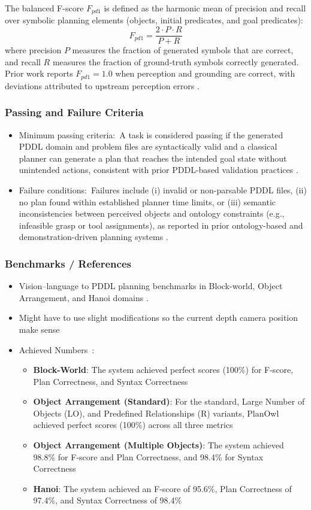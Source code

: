 \documentclass[12pt]{article}
\begin{document}
The balanced F-score $F_{pd1}$ is defined as the harmonic mean of precision and recall over symbolic planning elements (objects, initial predicates, and goal predicates):
\[
F_{pd1} = \frac{2 \cdot P \cdot R}{P + R}
\]
where precision $P$ measures the fraction of generated symbols that are correct, and recall $R$ measures the fraction of ground-truth symbols correctly generated. Prior work reports $F_{pd1} = 1.0$ when perception and grounding are correct, with deviations attributed to upstream perception errors \cite{planowl}.

\subsubsection{Passing and Failure Criteria}
\begin{itemize}
\item Minimum passing criteria:\ 
A task is considered passing if the generated PDDL domain and problem files are syntactically valid and a classical planner can generate a plan that reaches the intended goal state without unintended actions, consistent with prior PDDL-based validation practices \cite{planowl,mbse}.
\item Failure conditions:\ 
Failures include (i) invalid or non-parsable PDDL files, (ii) no plan found within established planner time limits, or (iii) semantic inconsistencies between perceived objects and ontology constraints (e.g., infeasible grasp or tool assignments), as reported in prior ontology-based and demonstration-driven planning systems \cite{diehl, ontology}.
\end{itemize}

\subsubsection{Benchmarks / References}
\begin{itemize}
\item Vision--language to PDDL planning benchmarks in Block-world, Object Arrangement, and Hanoi domains \cite{planowl}.
\item Might have to use slight modifications so the current depth camera position make sense
\item Achieved Numbers~\cite{planowl}:
\begin{itemize}
    \item \textbf{Block-World}: The system achieved perfect scores (100\%) for F-score, Plan Correctness, and Syntax Correctness
    \item \textbf{Object Arrangement (Standard)}: For the standard, Large Number of Objects (LO), and Predefined Relationships (R) variants, PlanOwl achieved perfect scores (100\%) across all three metrics
    \item \textbf{Object Arrangement (Multiple Objects)}: The system achieved 98.8\% for F-score and Plan Correctness, and 98.4\% for Syntax Correctness
    \item \textbf{Hanoi}: The system achieved an F-score of 95.6\%, Plan Correctness of 97.4\%, and Syntax Correctness of 98.4\%
\end{itemize}
\end{itemize}
\end{document}
